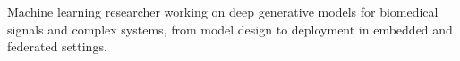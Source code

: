 \vspace{2pt}
{\small
Machine learning researcher working on deep generative models for biomedical
signals and complex systems, from model design to deployment in embedded and
federated settings.
}
\vspace{2pt}
